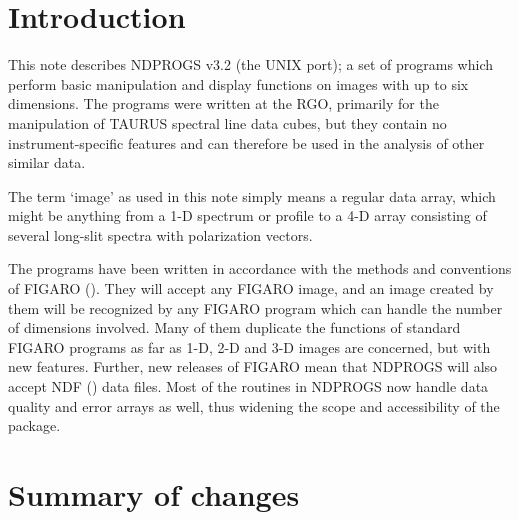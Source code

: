 \stardocabstract
 \newpage
 \begin{latexonly}
   \setlength{\parskip}{0mm}
   \latexonlytoc
   \setlength{\parskip}{\medskipamount}
   \markright{\stardocname}
 \end{latexonly}
\cleardoublepage

\renewcommand{\thepage}{\arabic{page}}
\setcounter{page}{1}

\section{Introduction{}}
\label{sec:introduction}

This note describes NDPROGS v3.2 (the UNIX port); a set of programs which 
perform basic
manipulation and display functions on images with up to six dimensions.
The programs were written at the RGO, primarily for the
manipulation of TAURUS spectral line data cubes, but they contain
no instrument-specific features and can therefore be used in the
analysis of other similar data.

The term `image' as used in this note simply means a regular data
array, which might be anything from a 1-D spectrum or profile to a 4-D
array consisting of several long-slit spectra with polarization
vectors.

The programs have been written in accordance with the methods and
conventions of FIGARO (). They will accept any 
FIGARO image, and
an image created by them will be recognized by any FIGARO program which
can handle the number of dimensions involved. Many of them duplicate
the functions of standard FIGARO programs as far as 1-D, 2-D and 3-D
images are concerned, but with new features. Further, new releases of
FIGARO mean that NDPROGS will also accept NDF () data files. Most of the
routines in NDPROGS now handle data quality and error arrays as well,
thus widening the scope and accessibility of the package.

\section{Summary of changes{}}
\label{sec:summary}

